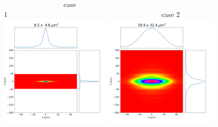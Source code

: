 \documentclass[]{article}
\begin{document}
  

\thispagestyle{empty}


\begin{figure}
    ~~~~~~~~~~~~~~~~~case 1~~~~~~~~~~~~~~~~~~~~~~~~~~~~~~~~~~~~~~~~~~~~case 2\\
    \includegraphics[width=0.49\textwidth]{figures/case1_wofry_ws_results.png}
    \includegraphics[width=0.49\textwidth]{figures/case2_wofry_ws_results.png}\\
    

\end{figure}
\end{document}
